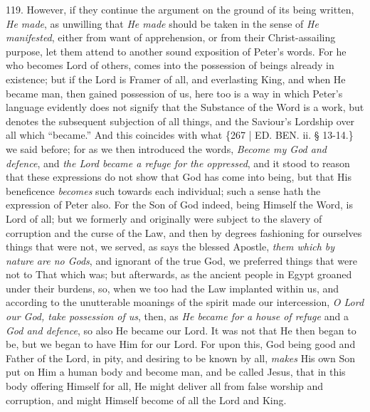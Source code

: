 119. However, if they continue
the argument on the ground of its being written, \emph{He made}, as
unwilling that \emph{He made} should be taken in the sense of \emph{He
manifested}, either from want of apprehension, or from their
Christ-assailing purpose, let them attend to another sound exposition
of Peter's words. For he who becomes Lord of others, comes into the
possession of beings already in existence; but if the Lord is Framer
of all, and everlasting King, and when He became man, then gained
possession of us, here too is a way in which Peter's language
evidently does not signify that the Substance of the Word is a work,
but denotes the subsequent subjection of all things, and the Saviour's
Lordship over all which ``became.'' And this coincides with what \{267 |
ED.
BEN.
ii. § 13-14.\} we said before; for as we then introduced the words, \emph{Become
my God and defence}, and \emph{the Lord became a refuge for the
oppressed}, and it stood to reason that these expressions do not
show that God has come into being, but that His beneficence \emph{becomes}
such towards each individual; such a sense hath the expression of
Peter also. For the Son of God indeed, being Himself the Word, is Lord
of all; but we formerly and originally were subject to the slavery of
corruption and the curse of the Law, and then by degrees fashioning
for ourselves things that were not, we served, as says the blessed
Apostle, \emph{them which by nature are no Gods}, and ignorant of the
true God, we preferred things that were not to That which was; but
afterwards, as the ancient people in Egypt groaned under their
burdens, so, when we too had the Law implanted within us, and
according to the unutterable moanings of the spirit made our
intercession, \emph{O Lord our God, take possession of us}, then, as \emph{He
became for a house of refuge} and a \emph{God and defence}, so also
He became our Lord. It was not that He then began to be, but we began
to have Him for our Lord. For upon this, God being good and Father of
the Lord, in pity, and desiring to be known by all, \emph{makes} His
own Son put on Him a human body and become man, and be called Jesus,
that in this body offering Himself for all, He might deliver all from
false worship and corruption, and might Himself become of all the Lord
and King.

